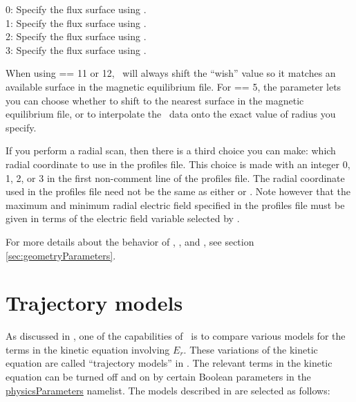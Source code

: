 {\setlength{\parindent}{0cm}

0: Specify the flux surface using .\\

1: Specify the flux surface using .\\

2: Specify the flux surface using .\\

3: Specify the flux surface using .\\

}

When using  == 11 or 12, \sfincs~will always shift the ``wish'' value so it matches an available surface in the magnetic equilibrium file.
For  == 5, the  parameter lets you can choose whether to shift to the nearest surface in the magnetic equilibrium file,
or to interpolate the \vmec~data onto the exact value of radius you specify.

If you perform a radial scan, then there is a third choice you can make: which radial coordinate to use in the {\ttfamily profiles} file.
This choice is made with an integer 0, 1, 2, or 3 in the first non-comment line of the {\ttfamily profiles} file.
The radial coordinate used in the {\ttfamily profiles} file need not be the same as either
 or .
Note however that the maximum and minimum radial electric field specified in the {\ttfamily profiles}
file must be given in terms of the electric field variable selected by .

For more details about the behavior of , , and ,
see section \ref{sec:geometryParameters}.

\section{Trajectory models}
\label{sec:trajectoryModels}

As discussed in \cite{sfincsPaper},
one of the capabilities of \sfincs~is to compare various models for the terms in the kinetic equation involving $E_r$.
These variations of the kinetic equation are called ``trajectory models'' in \cite{sfincsPaper}.
The relevant terms in the kinetic equation can be turned off and on by certain Boolean parameters in the {\ttfamily \hyperref[sec:physicsParameters]{physicsParameters}} namelist.
The models described in \cite{sfincsPaper} are selected as follows:\\


